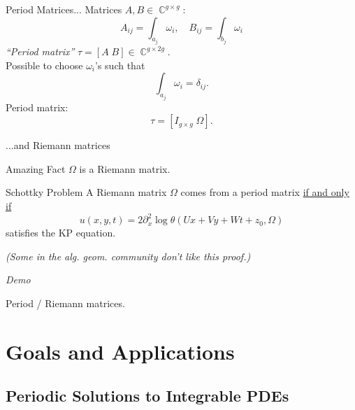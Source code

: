 \documentclass{beamer}
\DeclareMathOperator{\CC}{\mathbb{C}}
\begin{document}
\begin{frame}{Period Matrices...}{}
  Matrices $A,B \in \CC^{g \times g}$:
  \[
      A_{ij} = \int_{a_j} \omega_i, \quad B_{ij} = \int_{b_j} \omega_i
  \]
  {\it ``Period matrix''} $\tau = [A \; B] \in \CC^{g \times 2g}$. \\
  \vspace{16pt}
  Possible to choose $\omega_i$'s such that
  \[
      \int_{a_j} \omega_i = \delta_{ij}.
  \]
  Period matrix:
  \[
      \tau = [I_{g \times g} \; \Omega].
  \]
\end{frame}



\begin{frame}{...and Riemann matrices}{}
  \begin{block}{Amazing Fact}
    $\Omega$ is a Riemann matrix.
  \end{block}
  \begin{block}{Schottky Problem}
    A Riemann matrix $\Omega$ comes from a period matrix \underline{if
      and only if}
    \[
        u(x,y,t) = 2 \partial_x^2 \log
        \theta(Ux + Vy + Wt + z_0, \Omega)
    \]
    satisfies the KP equation.
  \end{block}
  {\it \tiny (Some in the alg. geom. community don't like this proof.)}
\end{frame}



\begin{frame}{\phantom{Demo}}{}
  \begin{center}
    {\huge \it Demo}

    \vspace{1cm}

    Period / Riemann matrices.
  \end{center}
\end{frame}



\section{Goals and Applications}

\subsection{Periodic Solutions to Integrable PDEs}
\end{document}
